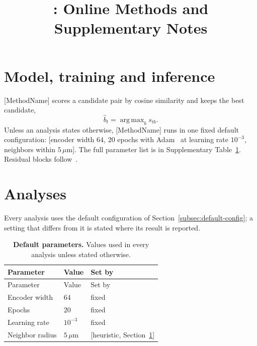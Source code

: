 \documentclass[10pt]{article}
\title{\method{}: Online Methods and Supplementary Notes}
\author{}
\date{}
\newcommand{\method}{[MethodName]}
\newcommand{\um}{\ensuremath{\,\mu\mathrm{m}}}
\DeclareMathOperator*{\argmax}{arg\,max}
\begin{document}
\maketitle
\setcounter{tocdepth}{1}
\tableofcontents

\section{Model, training and inference}\label{sec:model}
\method{} scores a candidate pair by cosine similarity and keeps the best
candidate,
\begin{equation}
  \hat b_t=\argmax_{b} s_{tb}.\label{eq:assign}
\end{equation}
Unless an analysis states otherwise, \method{} runs in one fixed default
configuration\label{subsec:default-config}: [encoder width $64$, $20$ epochs
with Adam~\citep{kingma2015adam} at learning rate $10^{-3}$, neighbors within
$5$\um{}]. The full parameter list is in Supplementary Table~\ref{tab:defaults}.
Residual blocks follow~\citep{he2016resnet,lecun1998gradient}.

\section{Analyses}\label{sec:analyses}
Every analysis uses the default configuration of
Section~\ref{subsec:default-config}; a setting that differs from it is stated
where its result is reported.

\begin{longtable}{@{}lll@{}}
\caption{\textbf{Default parameters.} Values used in every analysis unless
stated otherwise.}\label{tab:defaults}\\
\toprule
Parameter & Value & Set by \\
\midrule
\endfirsthead
\toprule
Parameter & Value & Set by \\
\midrule
\endhead
\bottomrule
\endfoot
Encoder width & $64$ & fixed \\
Epochs & $20$ & fixed \\
Learning rate & $10^{-3}$ & fixed \\
Neighbor radius & $5$\um{} & [heuristic, Section~\ref{sec:model}] \\
\end{longtable}



\end{document}
